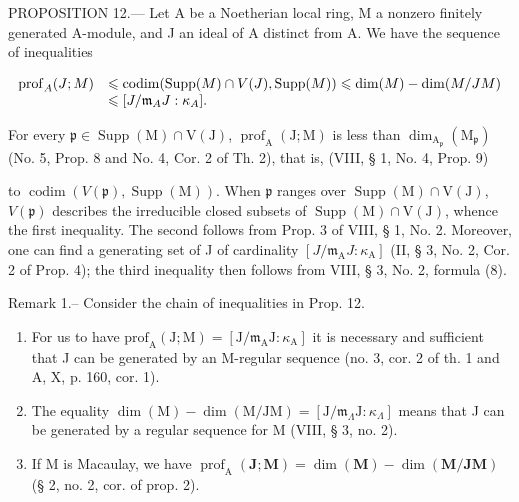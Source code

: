 PROPOSITION 12.--- Let A be a Noetherian local ring, M a nonzero finitely generated A-module, and J an ideal of A distinct from A. We have the sequence of inequalities

\[
\begin{array}{r l} \operatorname{prof} _ {A} (J; M) & \leqslant \operatorname{codim} (\operatorname{Supp} (M) \cap V (J), \operatorname{Supp} (M)) \leqslant \dim (M) - \dim (M / J M) \\ & \leqslant [ J / \mathfrak {m} _ {A} J: \kappa_ {A} ]. \end{array}
\]

For every \(\mathfrak{p} \in \operatorname{Supp}(\mathrm{M})\cap \mathrm{V}(\mathrm{J})\), \(\operatorname{prof}_{\mathrm{A}}(\mathrm{J};\mathrm{M})\) is less than \(\dim_{\mathrm{A}_{\mathfrak{p}}}(\mathrm{M}_{\mathfrak{p}})\) (No. 5, Prop. 8 and No. 4, Cor. 2 of Th. 2), that is, (VIII, § 1, No. 4, Prop. 9)

to \(\operatorname{codim}(V(\mathfrak{p}),\operatorname{Supp}(\mathrm{M}))\). When \(\mathfrak{p}\) ranges over \(\operatorname{Supp}(\mathrm{M}) \cap \mathrm{V}(\mathrm{J})\), \(V(\mathfrak{p})\) describes the irreducible closed subsets of \(\operatorname{Supp}(\mathrm{M}) \cap \mathrm{V}(\mathrm{J})\), whence the first inequality. The second follows from Prop. 3 of VIII, § 1, No. 2. Moreover, one can find a generating set of J of cardinality \([J/\mathfrak{m}_{\mathrm{A}}J:\kappa_{\mathrm{A}}]\) (II, § 3, No. 2, Cor. 2 of Prop. 4); the third inequality then follows from VIII, § 3, No. 2, formula (8).

Remark 1.-- Consider the chain of inequalities in Prop. 12.

\begin{enumerate}
\def\labelenumi{\alph{enumi})}
\item
  For us to have \(\mathrm{prof}_{\mathrm{A}}(\mathrm{J};\mathrm{M}) = [\mathrm{J} / \mathfrak{m}_{\mathrm{A}}\mathrm{J}:\kappa_{\mathrm{A}}]\) it is necessary and sufficient that J can be generated by an M-regular sequence (no. 3, cor. 2 of th. 1 and A, X, p. 160, cor. 1).
\item
  The equality \(\dim(\mathrm{M}) - \dim(\mathrm{M}/\mathrm{JM}) = [\mathrm{J}/\mathfrak{m}_{\Lambda}\mathrm{J} : \kappa_{\Lambda}]\) means that J can be generated by a regular sequence for M (VIII, § 3, no. 2).
\item
  If M is Macaulay, we have \(\operatorname{prof}_{\mathrm{A}}(\mathbf{J};\mathbf{M}) = \dim (\mathbf{M}) - \dim (\mathbf{M} / \mathbf{JM})\) (§ 2, no. 2, cor. of prop. 2).
\end{enumerate}

